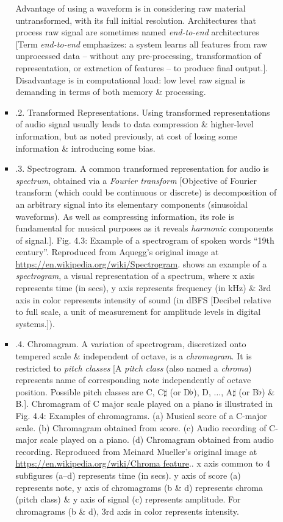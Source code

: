 \documentclass{article}
\begin{document}
\begin{itemize}
\begin{itemize}
\begin{itemize}
			Advantage of using a waveform is in considering raw material untransformed, with its full initial resolution. Architectures that process raw signal are sometimes named {\it end-to-end} architectures [Term {\it end-to-end} emphasizes: a system learns all features from raw unprocessed data -- without any pre-processing, transformation of representation, or extraction of features -- to produce final output.]. Disadvantage is in computational load: low level raw signal is demanding in terms of both memory \& processing.
			\item {.2. Transformed Representations.} Using transformed representations of audio signal usually leads to data compression \& higher-level information, but as noted previously, at cost of losing some information \& introducing some bias.
			\item {.3. Spectrogram.} A common transformed representation for audio is {\it spectrum}, obtained via a {\it Fourier transform} [Objective of Fourier transform (which could be continuous or discrete) is decomposition of an arbitrary signal into its elementary components (sinusoidal waveforms). As well as compressing information, its role is fundamental for musical purposes as it reveals {\it harmonic} components of signal.]. {\sf Fig. 4.3: Example of a spectrogram of spoken words ``19th century''. Reproduced from {\sc Aquegg}'s original image at \url{https://en.wikipedia.org/wiki/Spectrogram}.} shows an example of a {\it spectrogram}, a visual representation of a spectrum, where x axis represents time (in secs), y axis represents frequency (in kHz) \& 3rd axis in color represents intensity of sound (in dBFS [Decibel relative to full scale, a unit of measurement for amplitude levels in digital systems.]).
			\item {.4. Chromagram.} A variation of spectrogram, discretized onto tempered scale \& independent of octave, is a {\it chromagram}. It is restricted to {\it pitch classes} [A {\it pitch class} (also named a {\it chroma}) represents name of corresponding note independently of octave position. Possible pitch classes are C, C$\sharp$ (or D$\flat$), D, $\ldots$, A$\sharp$ (or B$\flat$) \& B.]. Chromagram of C major scale played on a piano is illustrated in {\sf Fig. 4.4: Examples of chromagrams. (a) Musical score of a C-major scale. (b) Chromagram obtained from score. (c) Audio recording of C-major scale played on a piano. (d) Chromagram obtained from audio recording. Reproduced from {\sc Meinard Mueller}'s original image at \url{https://en.wikipedia.org/wiki/Chroma feature}.}. x axis common to 4 subfigures (a--d) represents time (in secs). y axis of score (a) represents note, y axis of chromagrams (b \& d) represents chroma (pitch class) \& y axis of signal (c) represents amplitude. For chromagrams (b \& d), 3rd axis in color represents intensity.

\end{itemize}
\end{itemize}
\end{itemize}
\end{document}
